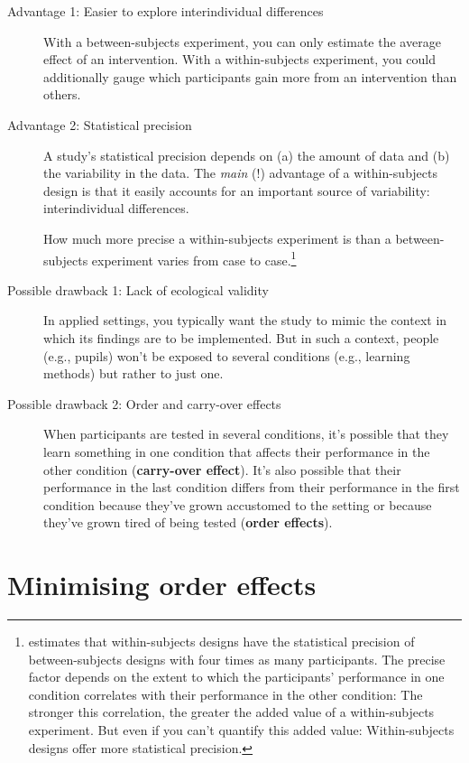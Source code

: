 \documentclass[a4paper]{tufte-book}\usepackage[]{graphicx}\usepackage[]{xcolor}
\newcommand{\term}[1]{\textbf{#1}}
\begin{document}
\begin{description}
 \item[Advantage 1: Easier to explore interindividual differences]
 With a between-subjects experiment, you can only estimate
 the average effect of an intervention.
 With a within-subjects experiment, you could additionally gauge
 which participants gain more from an intervention than others.

 \item[Advantage 2: Statistical precision]
 A study's statistical precision depends on
 (a) the amount of data and
 (b) the variability in the data. 
 The \emph{main} (!) advantage of a within-subjects design is that it easily
 accounts for an important source of variability: interindividual differences.
 
 How much more precise a within-subjects experiment is than a
 between-subjects experiment varies from case to case.\footnote{\citet{Quene2010} 
 estimates that within-subjects designs have the statistical precision
 of between-subjects designs with four times as many participants.
 The precise factor depends on the extent to which the participants'
 performance in one condition correlates with their performance in the
 other condition:
 The stronger this correlation, the greater the added value of a
 within-subjects experiment.
 But even if you can't quantify this added value: 
 Within-subjects designs offer more statistical precision.}

 \item[Possible drawback 1: Lack of ecological validity] 
 In applied settings, you typically want the study 
 to mimic the context in which its findings are to be implemented.
 But in such a context, people (e.g., pupils) won't be exposed to several 
 conditions (e.g., learning methods) but rather to just one.
 
 \item[Possible drawback 2: Order and carry-over effects]
 When participants are tested in several conditions,
 it's possible that they learn something in one condition
 that affects their performance in the other condition (\term{carry-over effect}).
 It's also possible that their performance in the last condition differs
 from their performance in the first condition because they've grown
 accustomed to the setting or because they've grown tired of being tested (\term{order effects}).
\end{description}

\section{Minimising order effects}
\end{document}
